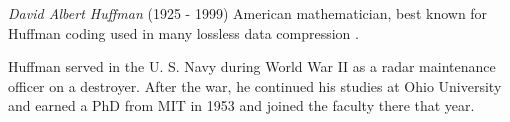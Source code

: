 \documentclass[12pt]{article}
\begin{document}
\emph{David Albert Huffman} (1925 - 1999) American mathematician, best known for Huffman coding used in many lossless data compression . 

Huffman served in the U. S. Navy during World War II as a radar maintenance officer on a destroyer. After the war, he continued his studies at Ohio  University and earned a PhD from MIT in 1953 and joined the faculty there that year.
\end{document}
